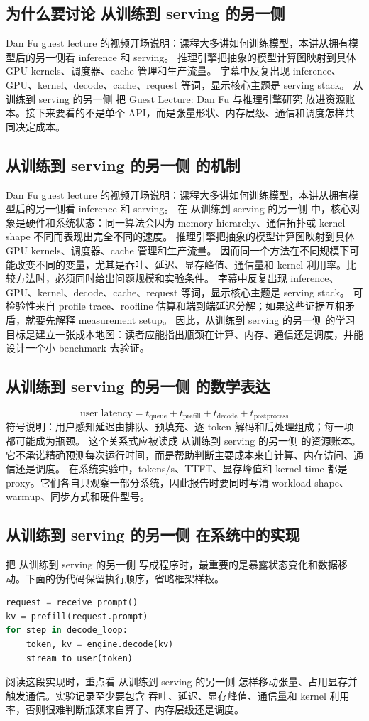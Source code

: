 \documentclass[a4paper]{article}
\begin{document}
\subsection{为什么要讨论 从训练到 serving 的另一侧}
Dan Fu guest lecture 的视频开场说明：课程大多讲如何训练模型，本讲从拥有模型后的另一侧看 inference 和 serving。
推理引擎把抽象的模型计算图映射到具体 GPU kernels、调度器、cache 管理和生产流量。
字幕中反复出现 inference、GPU、kernel、decode、cache、request 等词，显示核心主题是 serving stack。
从训练到 serving 的另一侧 把 Guest Lecture: Dan Fu 与推理引擎研究 放进资源账本。接下来要看的不是单个 API，而是张量形状、内存层级、通信和调度怎样共同决定成本。
\subsection{从训练到 serving 的另一侧 的机制}
Dan Fu guest lecture 的视频开场说明：课程大多讲如何训练模型，本讲从拥有模型后的另一侧看 inference 和 serving。 在 从训练到 serving 的另一侧 中，核心对象是硬件和系统状态：同一算法会因为 memory hierarchy、通信拓扑或 kernel shape 不同而表现出完全不同的速度。
推理引擎把抽象的模型计算图映射到具体 GPU kernels、调度器、cache 管理和生产流量。 因而同一个方法在不同规模下可能改变不同的变量，尤其是吞吐、延迟、显存峰值、通信量和 kernel 利用率。比较方法时，必须同时给出问题规模和实验条件。
字幕中反复出现 inference、GPU、kernel、decode、cache、request 等词，显示核心主题是 serving stack。 可检验性来自 profile trace、roofline 估算和端到端延迟分解；如果这些证据互相矛盾，就要先解释 measurement setup。
因此，从训练到 serving 的另一侧 的学习目标是建立一张成本地图：读者应能指出瓶颈在计算、内存、通信还是调度，并能设计一个小 benchmark 去验证。
\subsection{从训练到 serving 的另一侧 的数学表达}
\[\text{user latency}=t_{\text{queue}}+t_{\text{prefill}}+t_{\text{decode}}+t_{\text{postprocess}}\]
符号说明：用户感知延迟由排队、预填充、逐 token 解码和后处理组成；每一项都可能成为瓶颈。
这个关系式应被读成 从训练到 serving 的另一侧 的资源账本。它不承诺精确预测每次运行时间，而是帮助判断主要成本来自计算、内存访问、通信还是调度。
在系统实验中，tokens/s、TTFT、显存峰值和 kernel time 都是 proxy。它们各自只观察一部分系统，因此报告时要同时写清 workload shape、warmup、同步方式和硬件型号。
\subsection{从训练到 serving 的另一侧 在系统中的实现}
把 从训练到 serving 的另一侧 写成程序时，最重要的是暴露状态变化和数据移动。下面的伪代码保留执行顺序，省略框架样板。
\begin{lstlisting}[language=Python]
request = receive_prompt()
kv = prefill(request.prompt)
for step in decode_loop:
    token, kv = engine.decode(kv)
    stream_to_user(token)
\end{lstlisting}
阅读这段实现时，重点看 从训练到 serving 的另一侧 怎样移动张量、占用显存并触发通信。实验记录至少要包含 吞吐、延迟、显存峰值、通信量和 kernel 利用率，否则很难判断瓶颈来自算子、内存层级还是调度。
\end{document}
